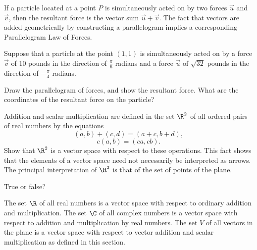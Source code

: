 \begin{exercises}
If a particle located at a point $P$ is simultaneously
acted on by two forces $\vec u$ and $\vec v$, then the
resultant force is the vector sum $\vec u + \vec v$.
The fact that vectors are added geometrically
by constructing a parallelogram implies a corresponding
Parallelogram Law of Forces.

Suppose that a particle at the point $(1,1)$ is
simultaneously acted on by a force $\vec v$
of $10$ pounds in the direction of $\frac\pi6$
radians and a force $\vec u$ of $\sqrt{32}$
pounds in the direction of $-\frac\pi4$ radians.
\begin{exenum}
\x
Draw the parallelogram of forces, and show
the resultant force.
\x
What are the coordinates of the resultant
force on the particle?
\end{exenum}

Addition and scalar multiplication are defined in the
set $\R^2$ of all ordered pairs of real numbers
by the equations
\[
(a,b) + (c,d) = (a+c,b+d)
,
\]
\[
c(a,b) = (ca,cb)
.
\]
Show that $\R^2$ is a vector space with respect
to these operations.  This fact shows that the elements
of a vector space need not necessarily be interpreted
as arrows.  The principal interpretation of $\R^2$
is that of the set of points of the plane.

True or false?
\begin{exenum}
\x
The set $\R$ of all real numbers is a vector space
with respect to ordinary addition and multiplication.
\x
The set $\C$ of all complex numbers is a vector space
with respect to addition and multiplication
by real numbers.
\x
The set $V$ of all vectors in the plane is a vector
space with respect to vector addition and scalar
multiplication as defined in this section.
\end{exenum}

\end{exercises}
